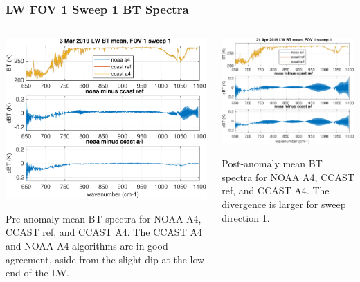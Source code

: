 \documentclass[10pt]{beamer}
\begin{document}
\begin{frame}
\frametitle{LW FOV 1 Sweep 1 BT Spectra}
\begin{columns}[t]
\begin{column}{0.5\textwidth}
  \begin{centering}
  \includegraphics[width=\textwidth]{figures/LW_MW_good_BT_fov1_sd1.pdf}
  \end{centering}\vspace{3mm}
  Pre-anomaly mean BT spectra for NOAA A4, CCAST ref, and CCAST A4.
  The CCAST A4 and NOAA A4 algorithms are in good agreement, aside
  from the slight dip at the low end of the LW.

\end{column}
\begin{column}{0.5\textwidth}  
  \begin{centering}
  \includegraphics[width=\textwidth]{figures/LW_MW_fail_BT_fov1_sd1.pdf}
  \end{centering}\vspace{3mm}
  Post-anomaly mean BT spectra for NOAA A4, CCAST ref, and CCAST A4.
  The divergence is larger for sweep direction 1.


\end{column}
\end{columns}
\end{frame}
\end{document}
